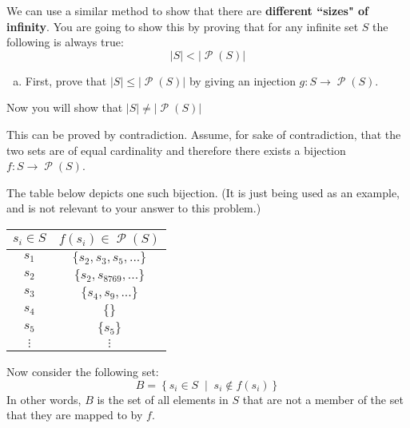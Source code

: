 \documentclass[12pt,letterpaper]{article}
\newcommand\setbuilder[2]{\ensuremath{\left\{#1\;\middle|\;#2\right\}}}
\newcommand\Pow{\ensuremath{\operatorname{\mathcal{P}}}}
\newenvironment{22enumerate}{\begin{enumerate}[a.]\itemsep0em}{\end{enumerate}}
\newif\ifsol
\newcommand{\solu}[2]{ \begin{mdframed} \ifsol #2 \else \vspace{#1} \fi \end{mdframed} }
\begin{document}
      We can use a similar method to show that
         there are \textbf{different ``sizes" of infinity}.
       You are going to show this by proving that for any infinite set $S$ the
        following is always true:
      \[ |S| < |\Pow(S)| \]

      \begin{22enumerate}
        \setcounter{enumi}{1}

      \item First, prove that $|S| \leq |\Pow(S)|$ by giving
      an injection $g:S\rightarrow \Pow(S)$.

        \solu{4cm}{$f(S) = \{S\}$}


      \end{22enumerate}

      Now you will show that $ |S| \neq |\Pow(S)| $


      This can be proved by contradiction. Assume, for sake of contradiction,
       that the two sets are of equal cardinality and
       therefore there exists a bijection $f:S\rightarrow \Pow(S)$.

      The table below depicts one such bijection.
      (It is just being used as an example,
       and is not relevant to your answer to this problem.)

      \begin{center}
      \begin{tabular}{c | c}
        $s_i \in S$ & $f(s_i) \in \Pow(S)$ \\
        \hline $s_1$ & $\{s_2, s_3, s_5, ... \}$ \\
         $s_2$ & $\{s_2, s_{8769}, ... \}$ \\
         $s_3$ & $\{s_4, s_9, ... \}$ \\
         $s_4$ & $\{\}$ \\
         $s_5$ & $\{s_5\}$ \\
         $\vdots$ & $\vdots$ \\
      \end{tabular}
      \end{center}
      Now consider the following set:
      \[B = \setbuilder{s_i \in S}{s_i \not\in f(s_i)} \]
      In other words, $B$ is the set of all elements in $S$ that are not a
      member of the set that they are mapped to by $f$.
\end{document}
